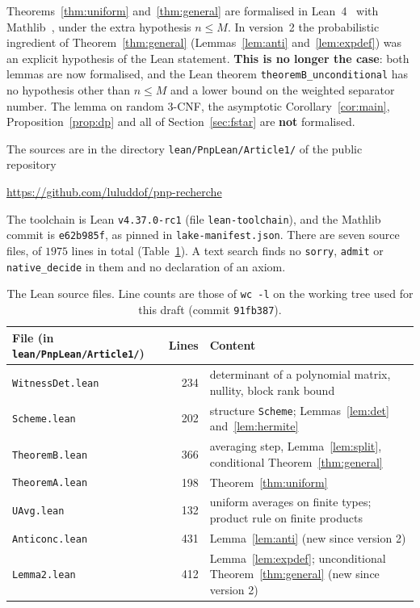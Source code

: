 \documentclass[11pt,a4paper]{article}
\theoremstyle{definition}
\theoremstyle{remark}
\begin{document}
\medskip
Theorems~\ref{thm:uniform} and~\ref{thm:general} are formalised in Lean~4~\cite{Lean4} with
Mathlib~\cite{Mathlib}, under the extra hypothesis $n\le M$. In version~2 the probabilistic
ingredient of Theorem~\ref{thm:general} (Lemmas~\ref{lem:anti} and~\ref{lem:expdef}) was an
explicit hypothesis of the Lean statement. \textbf{This is no longer the case}: both lemmas
are now formalised, and the Lean theorem \texttt{theoremB\_unconditional} has no hypothesis
other than $n\le M$ and a lower bound on the weighted separator number. The lemma on random
3-CNF, the asymptotic Corollary~\ref{cor:main}, Proposition~\ref{prop:dp} and all of
Section~\ref{sec:fstar} are \textbf{not} formalised.

The sources are in the directory \texttt{lean/PnpLean/Article1/} of the public repository
\begin{center}
\url{https://github.com/luluddof/pnp-recherche}
\end{center}
The toolchain is Lean \texttt{v4.37.0-rc1} (file \texttt{lean-toolchain}), and the Mathlib
commit is \texttt{e62b985f}, as pinned in \texttt{lake-manifest.json}. There are seven
source files, of $1975$ lines in total (Table~\ref{tab:leanfiles}). A text search finds no
\texttt{sorry}, \texttt{admit} or \texttt{native\_decide} in them and no declaration of an
axiom.

\begin{table}[htb]
\centering
\small
\begin{tabular}{@{}lr>{\raggedright\arraybackslash}p{8.3cm}@{}}
\toprule
File (in \texttt{lean/PnpLean/Article1/}) & Lines & Content\\
\midrule
\texttt{WitnessDet.lean} & 234 & determinant of a polynomial matrix, nullity, block rank bound\\
\texttt{Scheme.lean} & 202 & structure \texttt{Scheme}; Lemmas~\ref{lem:det} and~\ref{lem:hermite}\\
\texttt{TheoremB.lean} & 366 & averaging step, Lemma~\ref{lem:split}, conditional Theorem~\ref{thm:general}\\
\texttt{TheoremA.lean} & 198 & Theorem~\ref{thm:uniform}\\
\texttt{UAvg.lean} & 132 & uniform averages on finite types; product rule on finite products\\
\texttt{Anticonc.lean} & 431 & Lemma~\ref{lem:anti} (new since version 2)\\
\texttt{Lemma2.lean} & 412 & Lemma~\ref{lem:expdef}; unconditional Theorem~\ref{thm:general} (new since version 2)\\
\bottomrule
\end{tabular}
\caption{The Lean source files. Line counts are those of \texttt{wc -l} on the working tree
used for this draft (commit \texttt{91fb387}).}\label{tab:leanfiles}
\end{table}
\end{document}

